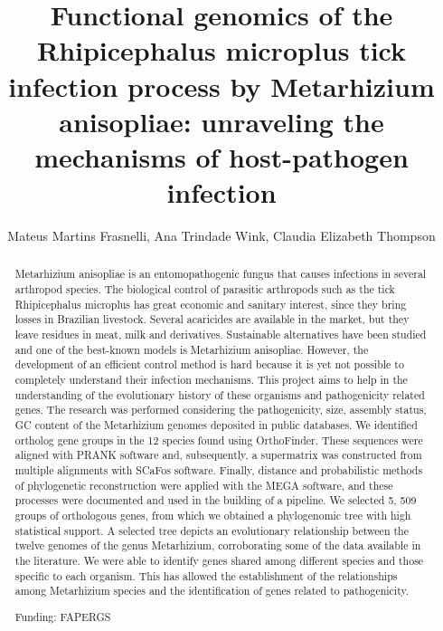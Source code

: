 \documentclass[twoside]{article}
\title{\vspace{-15mm}\fontsize{24pt}{10pt}\selectfont\textbf{ Functional genomics of the Rhipicephalus microplus tick infection process by Metarhizium anisopliae: unraveling the mechanisms of host-pathogen infection }} %
\author{ Mateus Martins Frasnelli, Ana Trindade Wink, Claudia Elizabeth Thompson }
\affil{ UFCSPA }
\date{}
\begin{document}
  
  
  \maketitle %
  
  
  \thispagestyle{fancy} %
  
  
  \begin{abstract}
  Metarhizium anisopliae is an entomopathogenic fungus that causes infections in several arthropod species. The biological control of parasitic arthropods such as the tick Rhipicephalus microplus has great economic and sanitary interest,  since they bring losses in Brazilian livestock. Several acaricides are available in the market,  but they leave residues in meat,  milk and derivatives. Sustainable alternatives have been studied and one of the best-known models is Metarhizium anisopliae. However,  the development of an efficient control method is hard because it is yet not possible to completely understand their infection mechanisms. This project aims to help in the understanding of the evolutionary history of these organisms and pathogenicity related genes. The research was performed considering the pathogenicity,  size,  assembly status,  GC content of the Metarhizium genomes deposited in public databases. We identified ortholog gene groups in the 12 species found using OrthoFinder. These sequences were aligned with PRANK software and,  subsequently,  a supermatrix was constructed from multiple alignments with SCaFos software. Finally,  distance and probabilistic methods of phylogenetic reconstruction were applied with the MEGA software,  and these processes were documented and used in the building of a pipeline. We selected 5, 509 groups of orthologous genes,  from which we obtained a phylogenomic tree with high statistical support. A selected tree depicts an evolutionary relationship between the twelve genomes of the genus Metarhizium,  corroborating some of the data available in the literature. We were able to identify genes shared among different species and those specific to each organism. This has allowed the establishment of the relationships among Metarhizium species and the identification of genes related to pathogenicity.
  
  Funding: FAPERGS \\ 
  \end{abstract}
  
\end{document}
